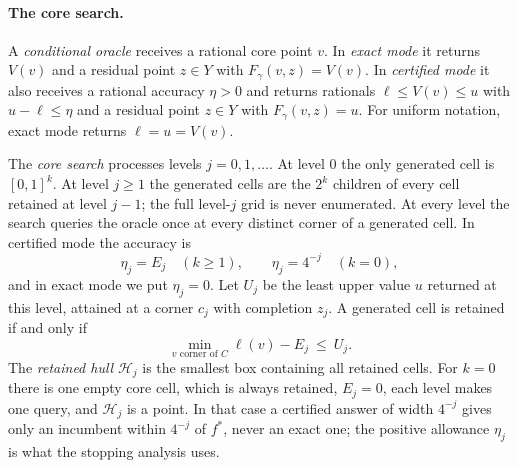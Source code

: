 \paragraph{The core search.}
A \emph{conditional oracle} receives a rational core point $v$. In
\emph{exact mode} it returns $V(v)$ and a residual point $z\in Y$ with
$F_\gamma(v,z)=V(v)$. In \emph{certified mode} it also receives a rational
accuracy $\eta>0$ and returns rationals $\ell\le V(v)\le u$ with
$u-\ell\le\eta$ and a residual point $z\in Y$ with $F_\gamma(v,z)=u$. For
uniform notation, exact mode returns $\ell=u=V(v)$.

The \emph{core search} processes levels $j=0,1,\ldots$. At level $0$ the
only generated cell is $[0,1]^k$. At level $j\ge1$ the generated cells are
the $2^k$ children of every cell retained at level $j-1$; the full level-$j$
grid is never enumerated. At every level the search queries the oracle once
at every distinct corner of a generated cell. In certified mode the
accuracy is
\begin{equation}\label{eq:rec:eta}
 \eta_j=E_j\quad(k\ge1),\qquad \eta_j=4^{-j}\quad(k=0),
\end{equation}
and in exact mode we put $\eta_j=0$. Let $U_j$ be the least upper value $u$
returned at this level, attained at a corner $c_j$ with completion $z_j$. A
generated cell is retained if and only if
\begin{equation}\label{eq:rec:retain}
 \min_{v\text{ corner of }C}\ell(v)-E_j\ \le\ U_j .
\end{equation}
The \emph{retained hull} $\mathcal H_j$ is the smallest box containing all
retained cells. For $k=0$ there is one empty core cell, which is always
retained, $E_j=0$, each level makes one query, and $\mathcal H_j$ is a point.
In that case a certified answer of width $4^{-j}$ gives only an incumbent
within $4^{-j}$ of $f^*$, never an exact one; the positive allowance
$\eta_j$ is what the stopping analysis uses.

